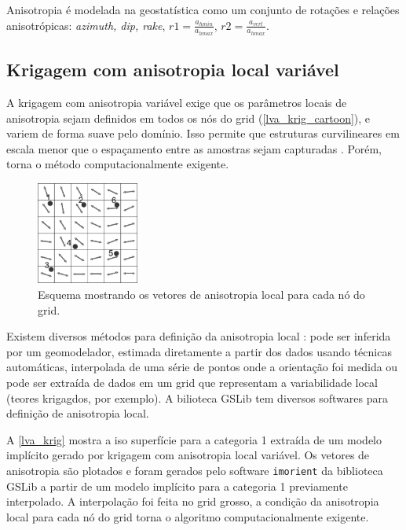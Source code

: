 Anisotropia é modelada na geostatística como um conjunto de rotações e relações anisotrópicas: \textit{azimuth, dip, rake}, $r1 = \frac{a_{hmin}}{a_{hmax}}$, $r2 = \frac{a_{vert}}{a_{hmax}}$. 

\subsection{Krigagem com anisotropia local variável}

A krigagem com anisotropia variável exige que os parâmetros locais de anisotropia sejam definidos em todos os nós do grid (\autoref{lva_krig_cartoon}), e variem de forma suave pelo domínio. Isso permite que estruturas curvilineares em escala menor que o espaçamento entre as amostras sejam capturadas \cite{martin2017implicitmodeling}. Porém, torna o método computacionalmente exigente.

\begin{figure}[H]
\caption{\label{lva_krig_cartoon}Esquema mostrando os vetores de anisotropia local para cada nó do grid.}
	\begin{center}
		\includegraphics[width=0.3\textwidth]{capitulo_2/lvakrig.jpg}
	\end{center}
\end{figure}

Existem diversos métodos para definição da anisotropia local \cite{lillah2015inference}: pode ser inferida por um geomodelador, estimada diretamente a partir dos dados usando técnicas automáticas, interpolada de uma série de pontos onde a orientação foi medida ou pode ser extraída de dados em um grid que representam a variabilidade local (teores krigagdos, por exemplo). A bilioteca GSLib tem diversos softwares para definição de anisotropia local. 

A \autoref{lva_krig} mostra a iso superfície para a categoria 1 extraída de um modelo implícito gerado por krigagem com anisotropia local variável. Os vetores de anisotropia são plotados e foram gerados pelo software \verb|imorient| da biblioteca GSLib a partir de um modelo implícito para a categoria 1 previamente interpolado. A interpolação foi feita no grid grosso, a condição da anisotropia local para cada nó do grid torna o algoritmo computacionalmente exigente.

